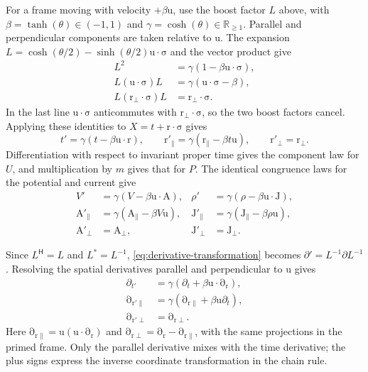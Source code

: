 \documentclass[11pt]{article}
\newcommand{\pv}[1]{{#1}}
\newcommand{\pvGreek}[1]{{#1}}
\newcommand{\vstyle}[1]{{\bm{\mathrm{#1}}}}
\newcommand{\pL}{\pv{L}}
\newcommand{\pP}{\pv{P}}
\newcommand{\pU}{\pv{U}}
\newcommand{\pX}{\pv{X}}
\newcommand{\pvpartial}{\pvGreek{\partial}}
\numberwithin{equation}{section}
\newcommand{\R}{\mathbb{R}}
\newcommand{\dotprod}{\cdot}
\newcommand{\bsig}{\vstyle{\sigma}}
\newcommand{\bA}{\vstyle{A}}
\newcommand{\br}{\vstyle{r}}
\newcommand{\bu}{\vstyle{u}}
\newcommand{\bJ}{\vstyle{J}}
\newcommand{\pdr}{\vstyle{\partial}_{\br}}
\begin{document}
For a frame moving with velocity $+\beta\bu$, use the boost factor
$\pL$ above, with $\beta=\tanh(\theta)\in(-1,1)$ and
$\gamma=\cosh(\theta)\in\R_{\ge1}$.
Parallel and perpendicular components are taken relative to $\bu$.
The expansion
$\pL=\cosh(\theta/2)-\sinh(\theta/2)\bu\dotprod\bsig$
and the vector product give
\begin{align*}
 \pL^2&=\gamma(1-\beta\bu\dotprod\bsig),\\
 \pL(\bu\dotprod\bsig)\pL&=\gamma(\bu\dotprod\bsig-\beta),\\
 \pL(\br_{\perp}\dotprod\bsig)\pL&=\br_{\perp}\dotprod\bsig.
\end{align*}
In the last line $\bu\dotprod\bsig$ anticommutes with
$\br_{\perp}\dotprod\bsig$, so the two boost factors cancel.
Applying these identities to $\pX=t+\br\dotprod\bsig$ gives
\[
 t'=\gamma(t-\beta\bu\dotprod\br),\qquad
 \br'_{\parallel}=\gamma(\br_{\parallel}-\beta t\bu),\qquad
 \br'_{\perp}=\br_{\perp}.
\]
Differentiation with respect to invariant proper time gives the component
law for $\pU$, and multiplication by $m$ gives that for $\pP$.
The identical congruence laws for the potential and current give
\begin{align*}
 V'&=\gamma(V-\beta\bu\dotprod\bA),
 &\rho'&=\gamma(\rho-\beta\bu\dotprod\bJ),\\
 \bA'_{\parallel}&=\gamma(\bA_{\parallel}-\beta V\bu),
 &\bJ'_{\parallel}&=\gamma(\bJ_{\parallel}-\beta\rho\bu),\\
 \bA'_{\perp}&=\bA_{\perp},
 &\bJ'_{\perp}&=\bJ_{\perp}.
\end{align*}

Since $\pL^{\mathsf H}=\pL$ and $\pL^*=\pL^{-1}$,
\eqref{eq:derivative-transformation} becomes
$\pvpartial'=\pL^{-1}\pvpartial\pL^{-1}$.
Resolving the spatial derivatives parallel and perpendicular to $\bu$ gives
\begin{align*}
 \partial_{t'}&=\gamma(\partial_t+\beta\bu\dotprod\pdr),\\
 \vstyle{\partial}_{\br'\parallel}
 &=\gamma(\vstyle{\partial}_{\br\parallel}+\beta\bu\partial_t),\\
 \vstyle{\partial}_{\br'\perp}&=\vstyle{\partial}_{\br\perp}.
\end{align*}
Here $\vstyle{\partial}_{\br\parallel}=\bu(\bu\dotprod\pdr)$ and
$\vstyle{\partial}_{\br\perp}=\pdr-\vstyle{\partial}_{\br\parallel}$,
with the same projections in the primed frame. Only the parallel derivative
mixes with the time derivative; the plus signs express the inverse coordinate
transformation in the chain rule.
\end{document}
